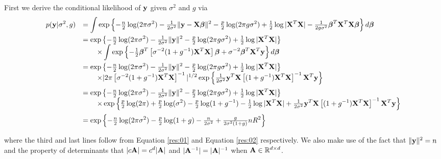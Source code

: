 \documentclass{amsart}[12pt]
\begin{document}
 
\noindent First we derive the conditional likelihood of ${\bf y}$ given $\sigma^2$ and $g$ via
$$
\begin{array}{rl}
	\displaystyle p({\bf y}|\sigma^2,g) 
	  & \displaystyle = \int \exp\left\{ 
	-\tfrac{n}{2}\log(2\pi\sigma^2) - \tfrac{1}{2\sigma^2}\|{\bf y} - {\bf X}{\boldsymbol \beta}\|^2
	-\tfrac{p}{2}\log(2\pi g\sigma^2) + \tfrac{1}{2}\log|{\bf X}^T{\bf X}| - \tfrac{1}{2g\sigma^2}{\boldsymbol \beta}^T{\bf X}^T{\bf X}{\boldsymbol \beta}
	\right\} d{\boldsymbol \beta}
	\\ [2ex]
	  & \displaystyle = \exp\left\{      
	-\tfrac{n}{2}\log(2\pi\sigma^2) - \tfrac{1}{2\sigma^2}\|{\bf y}\|^2 -\tfrac{p}{2}\log(2\pi g\sigma^2) + \tfrac{1}{2}\log|{\bf X}^T{\bf X}| \right\}
	\\
	  & \displaystyle \qquad \times \int 
	\exp\left\{ - \tfrac{1}{2}{\boldsymbol \beta}^T \left[ \sigma^{-2}(1+g^{-1}){\bf X}^T{\bf X} \right]{\boldsymbol\beta} + \sigma^{-2}{\boldsymbol \beta}^T{\bf X}^T{\bf y}
	\right\} d{\boldsymbol \beta} \\ [2ex]
	  & \displaystyle = \exp\left\{      
	-\tfrac{n}{2}\log(2\pi\sigma^2) - \tfrac{1}{2\sigma^2}\|{\bf y}\|^2 -\tfrac{p}{2}\log(2\pi g\sigma^2) + \tfrac{1}{2}\log|{\bf X}^T{\bf X}| \right\}
	\\
	  & \displaystyle \qquad \times      
	|2\pi \left[ \sigma^{-2}(1+g^{-1}){\bf X}^T{\bf X} \right]^{-1}|^{1/2}\exp\left\{  \tfrac{1}{2\sigma^2}  {\bf y}^T{\bf X}\left[ (1+g^{-1}){\bf X}^T{\bf X} \right]^{-1}{\bf X}^T{\bf y}
	\right\}
	\\ [2ex]
	  & \displaystyle = \exp\left\{      
	-\tfrac{n}{2}\log(2\pi\sigma^2) 
	- \tfrac{1}{2\sigma^2}\|{\bf y}\|^2 
	-\tfrac{p}{2}\log(2\pi g\sigma^2) 
	+ \tfrac{1}{2}\log|{\bf X}^T{\bf X}| \right\}
	\\
	  & \displaystyle \qquad \times      
	\exp\left\{ 
	\tfrac{p}{2}\log(2\pi) 
	+ \tfrac{p}{2}\log(\sigma^2)
	- \tfrac{p}{2}\log(1+g^{-1})
	- \tfrac{1}{2}\log|{\bf X}^T{\bf X}| 
	+ \tfrac{1}{2\sigma^2}  {\bf y}^T{\bf X}\left[ (1+g^{-1}){\bf X}^T{\bf X} \right]^{-1}{\bf X}^T{\bf y}
	\right\}
	\\ [2ex]
	  & \displaystyle = \exp\left\{      
	-\tfrac{n}{2}\log(2\pi\sigma^2) 
	- \tfrac{p}{2}\log(1+g)
	- \tfrac{n}{2\sigma^2} 
	+ \tfrac{g}{2\sigma^2(1+g)} n R^2
	\right\}
\end{array}
$$

\noindent where the third and last lines follow from
Equation \ref{res:01} and Equation \ref{res:02} respectively.
We also make use of the fact that $\|{\bf y}\|^2 = n$ and the property of determinants that $|c{\bf A}| = c^d|{\bf A}|$ and $|{\bf A}^{-1}| = |{\bf A}|^{-1}$ when ${\bf A} \in{\mathbb R}^{d\times d}$.

\end{document}
